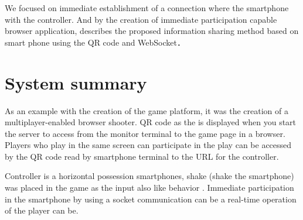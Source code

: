 We focused on immediate establishment of a connection where the smartphone with the controller. And by the creation of immediate participation capable browser application, describes the proposed information sharing method based on smart phone using the QR code and WebSocket\cite{ec2015}．


\section{System summary}

As an example with the creation of the game platform, it was the creation of a multiplayer-enabled browser shooter. QR code as the  is displayed when you start the server to access from the monitor terminal to the game page in a browser. Players who play in the same screen can participate in the play can be accessed by the QR code read by smartphone terminal to the URL for the controller.

Controller is a horizontal possession smartphones, shake (shake the smartphone) was placed in the game as the input also like behavior . Immediate participation in the smartphone by using a socket communication \cite{webpagesocketio} can be a real-time operation of the player can be.


